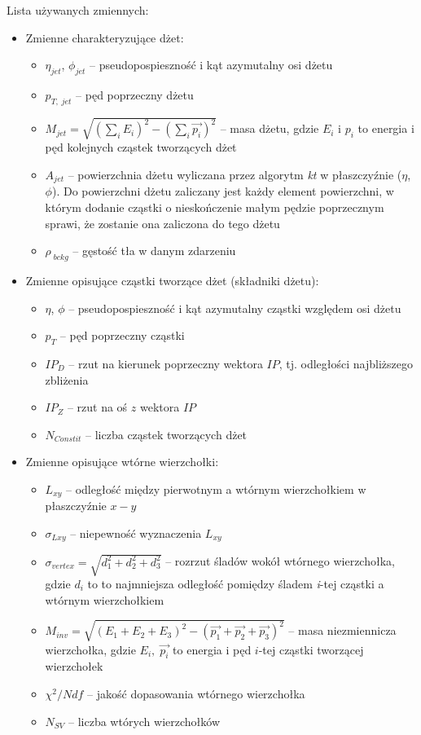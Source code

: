 Lista używanych zmiennych:
\begin{itemize}
	\item Zmienne charakteryzujące dżet:
	\begin{itemize}	
		\item $\eta_{jet}$, $\phi_{jet}$ -- pseudopospieszność i kąt azymutalny osi dżetu
		\item $p_{T,\;jet}$ -- pęd poprzeczny dżetu
		\item $M_{jet} = \sqrt{ \left(\sum_i E_i\right)^2  -  \left(\sum_i \vec{p_i}\right)^2 }$ -- masa dżetu, gdzie $E_i$ i $p_i$ to energia i pęd kolejnych cząstek tworzących dżet
		\item $A_{jet}$ -- powierzchnia dżetu wyliczana przez algorytm \textit{kt} w płaszczyźnie ($\eta$, $\phi$). Do powierzchni dżetu zaliczany jest każdy element powierzchni, w którym dodanie cząstki o nieskończenie małym pędzie poprzecznym sprawi, że zostanie ona zaliczona do tego dżetu \cite{Cacciari:2007fd}
		\item $\rho_{\;bckg}$ -- gęstość tła w danym zdarzeniu
	\end{itemize}
	
	\item Zmienne opisujące cząstki tworzące dżet (składniki dżetu):
	\begin{itemize}	
		\item $\eta$, $\phi$ -- pseudopospieszność i kąt azymutalny cząstki względem osi dżetu
		\item $p_T$ -- pęd poprzeczny cząstki
		\item $IP_D$ -- rzut na kierunek poprzeczny wektora $IP$, tj. odległości najbliższego zbliżenia
		\item $IP_Z$ -- rzut na oś $z$ wektora $IP$
		\item $N_{Constit}$ -- liczba cząstek tworzących dżet
	\end{itemize}	
	
	
	\item Zmienne opisujące wtórne wierzchołki:
	\begin{itemize}	
		\item $L_{xy}$ -- odległość między pierwotnym a wtórnym wierzchołkiem  w płaszczyźnie $x-y$
		\item $\sigma_{Lxy}$ -- niepewność wyznaczenia $L_{xy}$
		\item $\sigma_{vertex} = \sqrt{d_1^2 + d_2^2 + d_3^2}$ -- rozrzut śladów  wokół wtórnego wierzchołka, gdzie $d_i$ to to najmniejsza odległość pomiędzy śladem \textit{i}-tej cząstki a wtórnym wierzchołkiem
		\item $M_{inv} = \sqrt{(E_1 + E_2 + E_3)^2 - (\vec{p_1} + \vec{p_2} + \vec{p_3})^2}$ -- masa niezmiennicza wierzchołka, gdzie $E_i,\;\vec{p_i}$ to energia i pęd $i$-tej cząstki tworzącej wierzchołek
		\item $\chi^2/Ndf$ -- jakość dopasowania wtórnego wierzchołka
		\item $N_{SV}$ -- liczba wtórych wierzchołków


\end{itemize}
\end{itemize}
